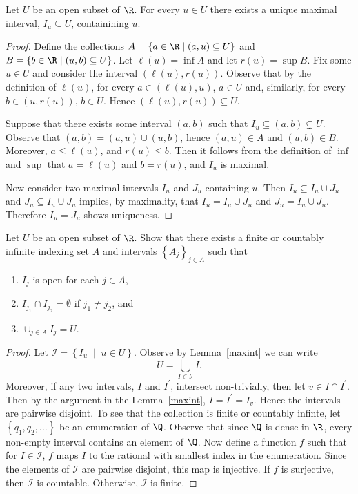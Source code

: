 \documentclass[12pt]{amsart}
\begin{document}
\begin{lem}\label{maxint}
  Let $U$ be an open subset of $\R$.  For every $u \in U$ there exists a unique maximal interval, $I_u \subseteq U$, containining $u$.
  \begin{proof}
    Define the collections $A = \left\{a \in \R \;\middle\vert\; (a,u) \subseteq U \right\}$ and $B = \left\{ b \in \R \;\middle\vert\; (u,b) \subseteq U \right\}$.
    Let $\ell(u) = \inf A$ and let $r(u) = \sup B$.
    Fix some $u \in U$ and consider the interval $(\ell(u), r(u))$.  
    Observe that by the definition of $\ell(u)$, for every $a \in (\ell(u), u)$, $a \in U$ and, similarly, for every $b \in (u, r(u))$, $b \in U$.
    Hence $(\ell(u), r(u)) \subseteq U$.
    
    Suppose that there exists some interval $(a,b)$ such that $I_u \subseteq (a,b) \subsetneq U$.
    Observe that $(a,b) = (a,u) \cup (u, b)$, hence $(a,u) \in A$ and $(u,b) \in B$.
    Moreover, $a \leq \ell(u)$, and $r(u) \leq b$.
    Then it follows from the definition of $\inf$ and $\sup$ that $a = \ell(u)$ and $b = r(u)$, and $I_u$ is maximal.

    Now consider two maximal intervals $I_u$ and $J_u$ containing $u$.
    Then $I_u \subseteq I_u \cup J_u$ and $J_u \subseteq I_u \cup J_u$ implies, by maximality, that $I_u = I_u \cup J_u$ and $J_u = I_u \cup J_u$.
    Therefore $I_u = J_u$ shows uniqueness.
  \end{proof}
  
\end{lem}

\begin{setup}
  Let $U$ be an open subset of $\R$.
  Show that there exists a finite or countably infinite indexing set $A$ and intervals $\left\{A_j\right\}_{j \in A}$ such that 
  \begin{enumerate}
  \item
    $I_j$ is open for each $j \in A$,
  \item
    $I_{j_1} \cap I_{j_2} = \emptyset$ if $j_1 \not = j_2$, and
  \item
    $\cup_{j \in A} I_j = U$.
  \end{enumerate}

  \begin{proof}
    Let $\mathcal{I} = \left\{I_u \;\middle\vert\; u \in U\right\}$.
    Observe by Lemma~\ref{maxint} we can write $$U = \bigcup_{I \in \mathcal{I}} I.$$
    Moreover, if any two intervals, $I$ and $I^\prime$, intersect non-trivially, then let $v \in I \cap I^\prime$.
    Then by the argument in the Lemma~\ref{maxint}, $I = I^\prime = I_v$.  
    Hence the intervals are pairwise disjoint.
    To see that the collection is finite or countably infinte, let $\left\{q_1, q_2, \ldots\right\}$ be an enumeration of $\Q$.
    Observe that since $\Q$ is dense in $\R$, every non-empty interval contains an element of $\Q$.
    Now define a function $f$ such that for $I \in \mathcal{I}$, $f$ maps $I$ to the rational with smallest index in the enumeration.
    Since the elements of $\mathcal{I}$ are pairwise disjoint, this map is injective.
    If $f$ is surjective, then $\mathcal{I}$ is countable.
    Otherwise, $\mathcal{I}$ is finite.
  \end{proof}
\end{setup}
\end{document}
